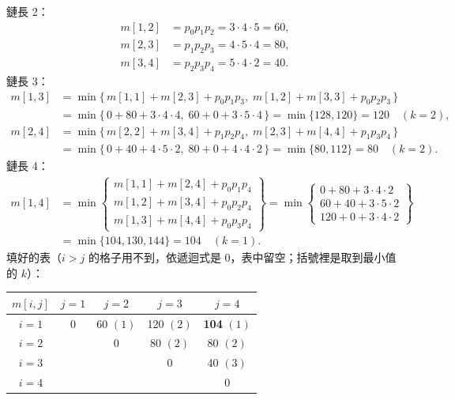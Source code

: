 \begin{pastsoln}
鏈長 2：
\begin{align*}
m[1, 2] &= p_0 p_1 p_2 = 3 \cdot 4 \cdot 5 = 60, \\
m[2, 3] &= p_1 p_2 p_3 = 4 \cdot 5 \cdot 4 = 80, \\
m[3, 4] &= p_2 p_3 p_4 = 5 \cdot 4 \cdot 2 = 40.
\end{align*}
鏈長 3：
\begin{align*}
m[1, 3] &= \min\{\, m[1,1] + m[2,3] + p_0 p_1 p_3,\; m[1,2] + m[3,3] + p_0 p_2 p_3 \,\} \\
        &= \min\{\, 0 + 80 + 3 \cdot 4 \cdot 4,\; 60 + 0 + 3 \cdot 5 \cdot 4 \,\}
         = \min\{128, 120\} = 120 \quad (k = 2), \\
m[2, 4] &= \min\{\, m[2,2] + m[3,4] + p_1 p_2 p_4,\; m[2,3] + m[4,4] + p_1 p_3 p_4 \,\} \\
        &= \min\{\, 0 + 40 + 4 \cdot 5 \cdot 2,\; 80 + 0 + 4 \cdot 4 \cdot 2 \,\}
         = \min\{80, 112\} = 80 \quad (k = 2).
\end{align*}
鏈長 4：
\begin{align*}
m[1, 4] &= \min\left\{\begin{array}{l} m[1,1] + m[2,4] + p_0 p_1 p_4 \\ m[1,2] + m[3,4] + p_0 p_2 p_4 \\
                    m[1,3] + m[4,4] + p_0 p_3 p_4 \end{array}\right\}
         = \min\left\{\begin{array}{l} 0 + 80 + 3 \cdot 4 \cdot 2 \\ 60 + 40 + 3 \cdot 5 \cdot 2 \\
                    120 + 0 + 3 \cdot 4 \cdot 2 \end{array}\right\} \\
        &= \min\{104, 130, 144\} = 104 \quad (k = 1).
\end{align*}
填好的表（$i > j$ 的格子用不到，依遞迴式是 $0$，表中留空；括號裡是取到最小值的 $k$）：
\begin{center}
\small
\begin{tabular}{c|cccc}
$m[i, j]$ & $j = 1$ & $j = 2$ & $j = 3$ & $j = 4$ \\
\hline
$i = 1$ & 0 & 60 $(1)$ & 120 $(2)$ & \textbf{104} $(1)$ \\
$i = 2$ &   & 0 & 80 $(2)$ & 80 $(2)$ \\
$i = 3$ &   &   & 0 & 40 $(3)$ \\
$i = 4$ &   &   &   & 0 \\
\end{tabular}
\end{center}


\end{pastsoln}

